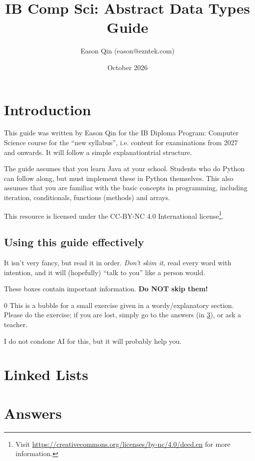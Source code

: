 \documentclass[a4paper, 11pt]{article}
\title{IB Comp Sci: Abstract Data Types Guide}
\author{Eason Qin (eason@ezntek.com)}
\date{October 2026}
\begin{document}
\setlength{\arrayrulewidth}{0.3pt}

\maketitle

\section{Introduction}

This guide was written by Eason Qin for the IB Diploma Program: Computer Science course for the ``new syllabus'',
i.e. content for examinations from 2027 and onwards. It will follow a simple explanation\-trial structure. 

The guide assumes that you learn Java at your school. Students who do Python can follow along, but must implement
these in Python themselves. This also assumes that you are familiar with the basic concepts in programming, including
iteration, conditionals, functions (methods) and arrays.

This resource is licensed under the CC-BY-NC 4.0 International license\footnote{Visit \url{https://creativecommons.org/licenses/by-nc/4.0/deed.en} for more information.}.

\subsection{Using this guide effectively}

It isn't very fancy, but read it in order. \emph{Don't skim it}, read every word with intention, and it will (hopefully)
``talk to you'' like a person would.

\begin{importantbox}
    These boxes contain important information. \textbf{Do NOT skip them!}
\end{importantbox}

\begin{tryitbox}{0}
    This is a bubble for a small exercise given in a wordy/explanatory section. Please do the exercise;
    if you are lost, simply go to the answers (in \ref{sec:answers}), or ask a teacher.

    I do not condone AI for this, but it will probably help you.
\end{tryitbox}

\newpage
\section{Linked Lists} \label{sec:linked-lists}


\newpage
\section{Answers} \label{sec:answers}

\end{document}
